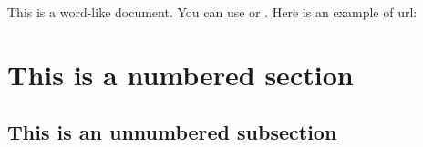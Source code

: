 This is a word-like document. You can use  or . Here is an example of url:
\lipsum[1]
\section{This is a numbered section}
\subsection*{This is an unnumbered subsection}
\lipsum[1]